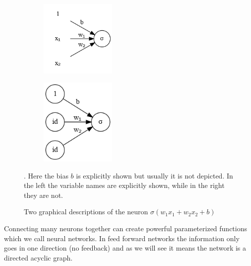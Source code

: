 \documentclass[11pt, a4paper]{report}
\theoremstyle{plain}
\theoremstyle{definition}
\theoremstyle{remark}
\begin{document}
\begin{figure}[h]
\centering
\begin{subfigure}[b]{0.45\textwidth}
\includegraphics[width=0.4\textwidth]{./plots/neuron.gv.png}
\end{subfigure}
\begin{subfigure}[b]{0.45\textwidth}
\includegraphics[width=0.4\textwidth]{./plots/neuron.2.gv.png}
\end{subfigure}
\caption{Two graphical descriptions of the neuron
$\sigma(w_1x_1 + w_2x_2 + b)$}. Here the bias $b$ is explicitly shown
but usually it is not depicted. In the left the variable names are explicitly
shown, while in the right they are not.
\label{fig:neuron2}
\end{figure}

Connecting many neurons together can create powerful parameterized
functions which we call neural networks.
In feed forward networks the information only goes in one direction (no
feedback) and as we will see it means the network is a directed acyclic graph.
\end{document}
